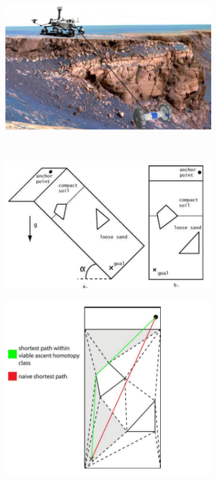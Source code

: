 \documentclass[12pt]{article}
\begin{document}
\begin{figure}
  \vspace{-0.2in}
  \begin{subfigure}{.45\textwidth}
    \centering
    \includegraphics[width=.95\linewidth]{axel_deploy}
    \caption{}
    \label{fig:axeldeploy}
  \end{subfigure}\\
  \begin{subfigure}{.25\textwidth}
    \centering
    \includegraphics[width=.99\linewidth]{planar_terrain}
    \caption{}
    \label{fig:planarterrain}
  \end{subfigure}%
  \begin{subfigure}{.2\textwidth}
    \centering
    \includegraphics[width=.95\linewidth]{planar_path}

\end{subfigure}
\end{figure}
\end{document}
